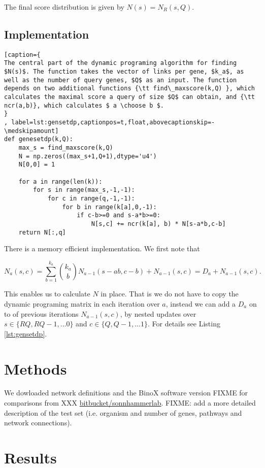 \documentclass[a4paper,american]{lipics-v2016}
\begin{document}
The final score distribution is given by $N(s)=N_R(s,Q)$.

\subsection*{Implementation}

\begin{lstlisting}[caption={
The central part of the dynamic programing algorithm for finding $N(s)$. The function takes the vector of links per gene, $k_a$, as well as the number of query genes, $Q$ as an input. The function depends on two additional functions {\tt find\_maxscore(k,Q) }, which calculates the maximal score a query of size $Q$ can obtain, and {\tt ncr(a,b)}, which calculates $ a \choose b $.
}
, label=lst:gensetdp,captionpos=t,float,abovecaptionskip=-\medskipamount]
def genesetdp(k,Q):
    max_s = find_maxscore(k,Q)
    N = np.zeros((max_s+1,Q+1),dtype='u4')
    N[0,0] = 1

    for a in range(len(k)):
        for s in range(max_s,-1,-1):
            for c in range(q,-1,-1):
                for b in range(k[a],0,-1):
                    if c-b>=0 and s-a*b>=0:
                        N[s,c] += ncr(k[a], b) * N[s-a*b,c-b]
    return N[:,q]
\end{lstlisting}
There is a memory efficient implementation. We first note that

\[
N_a(s,c)=\sum_{b=1}^{k_a}{k_a \choose b} N_{a-1}(s-ab,c-b) + N_{a-1}(s,c)=D_a+N_{a-1}(s,c).
\]


This enables us to calculate $N$ in place. That is we do not have to copy the dynamic programing matrix in each iteration over $a$,
instead we can add a $D_a$ on to of previous iterations $N_{a-1}(s,c)$, by nested updates over $s \in \{ RQ, RQ-1, \ldots 0 \}$ and $c \in \{ Q, Q-1, \ldots 1 \}$. For details see Listing \ref{lst:gensetdp}.

\section*{Methods}

We dowloaded network definitions and the BinoX software version FIXME for comparisons from XXX \url{bitbucket/sonnhammerlab}. FIXME: add a more detailed description of the test set (i.e. organism and number of genes, pathways and network connections).

\section*{Results}
\end{document}
